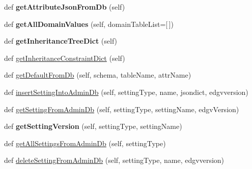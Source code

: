 \begin{DoxyCompactItemize}
def {\bfseries get\+Attribute\+Json\+From\+Db} (self)
\item 
\mbox{\label{class_dsg_tools_1_1_factories_1_1_db_factory_1_1postgis_db_1_1_postgis_db_a174686abafb7aa604ce61ff0c5c5f36e}} 
def {\bfseries get\+All\+Domain\+Values} (self, domain\+Table\+List=\mbox{[}$\,$\mbox{]})
\item 
\mbox{\label{class_dsg_tools_1_1_factories_1_1_db_factory_1_1postgis_db_1_1_postgis_db_a50b360ea083c57224b455987fc50eb66}} 
def {\bfseries get\+Inheritance\+Tree\+Dict} (self)
\item 
def \mbox{\hyperlink{class_dsg_tools_1_1_factories_1_1_db_factory_1_1postgis_db_1_1_postgis_db_a29ffcba875e47469dd6de1c3c0ddfd25}{get\+Inheritance\+Constraint\+Dict}} (self)
\item 
def \mbox{\hyperlink{class_dsg_tools_1_1_factories_1_1_db_factory_1_1postgis_db_1_1_postgis_db_a9a7e50f5c1adba49a717f5d8834d5d3d}{get\+Default\+From\+Db}} (self, schema, table\+Name, attr\+Name)
\item 
def \mbox{\hyperlink{class_dsg_tools_1_1_factories_1_1_db_factory_1_1postgis_db_1_1_postgis_db_ab0b5f32dfd0746bdbf5fa2c43551ee47}{insert\+Setting\+Into\+Admin\+Db}} (self, setting\+Type, name, jsondict, edgvversion)
\item 
def \mbox{\hyperlink{class_dsg_tools_1_1_factories_1_1_db_factory_1_1postgis_db_1_1_postgis_db_aa1c8e310a041de3d41cab1aad19845e2}{get\+Setting\+From\+Admin\+Db}} (self, setting\+Type, setting\+Name, edgv\+Version)
\item 
\mbox{\label{class_dsg_tools_1_1_factories_1_1_db_factory_1_1postgis_db_1_1_postgis_db_a40e48e8af29c4163fb9d2bdc30d7a769}} 
def {\bfseries get\+Setting\+Version} (self, setting\+Type, setting\+Name)
\item 
def \mbox{\hyperlink{class_dsg_tools_1_1_factories_1_1_db_factory_1_1postgis_db_1_1_postgis_db_a87f17b0f87c84679d77ca6a197c78eaf}{get\+All\+Settings\+From\+Admin\+Db}} (self, setting\+Type)
\item 
def \mbox{\hyperlink{class_dsg_tools_1_1_factories_1_1_db_factory_1_1postgis_db_1_1_postgis_db_a3269189dc84caffd1f24865c7f868cdf}{delete\+Setting\+From\+Admin\+Db}} (self, setting\+Type, name, edgvversion)

\end{DoxyCompactItemize}
